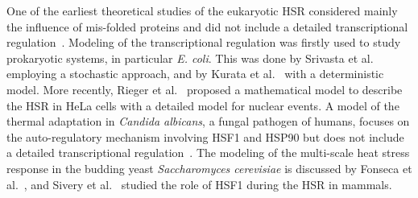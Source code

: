 \documentclass[oneside, 10pt, a4paper, twocolumn]{article}
\begin{document}
One of the earliest theoretical studies of the eukaryotic HSR considered mainly the influence of mis-folded proteins and did not include a detailed transcriptional regulation~\cite{Peper1998}. 
Modeling of the transcriptional regulation was firstly used to study prokaryotic
systems, in particular \emph{E. coli}.
This was done by Srivasta et al.~\cite{Srivastava2001} employing a stochastic approach, and by Kurata et al.~\cite{Kurata2001} with a deterministic model. 
More recently, Rieger et al.~\cite{Rieger2005} %
proposed a mathematical model to describe the HSR in HeLa cells with a detailed model for nuclear events. 
A %
model of the thermal adaptation in \emph{Candida albicans}, a fungal pathogen of humans, focuses on the auto-regulatory mechanism involving HSF1 and HSP90 %
but does not include a detailed transcriptional regulation~\cite{Leach2012model, Leach2012description}. 
The modeling of the multi-scale heat stress response in the budding yeast \emph{Saccharomyces cerevisiae} is discussed by Fonseca et al.~\cite{Fonseca2012}, and Sivery et al.~\cite{Sivery2015} studied the role of HSF1 during the HSR in mammals. 


\end{document}
